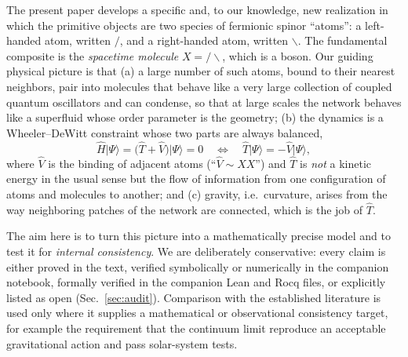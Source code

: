 \documentclass[reprint,aps,prd,amsmath,amssymb,superscriptaddress,nofootinbib,floatfix]{revtex4-2}
\theoremstyle{plain}
\theoremstyle{definition}
\theoremstyle{remark}
\newcommand{\Lat}{\ensuremath{/}}                 %
\newcommand{\Rat}{\ensuremath{\backslash}}        %
\newcommand{\Mol}{\ensuremath{X}}                 %
\newcommand{\ket}[1]{\ensuremath{|#1\rangle}}
\newcommand{\Hc}{\hat{H}}
\newcommand{\Tc}{\hat{T}}
\newcommand{\Vc}{\hat{V}}
\begin{document}
The present paper develops a specific and, to our knowledge, new realization in which the primitive
objects are two species of fermionic spinor ``atoms'': a left-handed atom, written $\Lat$, and a right-handed atom,
written $\Rat$. The fundamental composite is the \emph{spacetime molecule} $\Mol=\Lat\Rat$, which is a boson. Our guiding
physical picture is that (a) a large number of such atoms, bound to their nearest neighbors, pair into molecules
that behave like a very large collection of coupled quantum oscillators and can condense, so that at
large scales the network behaves like a superfluid whose order parameter is the geometry; (b) the dynamics is a
Wheeler--DeWitt constraint whose two parts are always balanced,
\begin{equation}
\Hc\ket{\Psi}=\big(\Tc+\Vc\big)\ket{\Psi}=0
\quad\Longleftrightarrow\quad
\Tc\ket{\Psi}=-\Vc\ket{\Psi},
\label{eq:balance}
\end{equation}
where $\Vc$ is the binding of adjacent atoms (``$\Vc\sim\Mol\Mol$'') and $\Tc$ is \emph{not} a kinetic energy
in the usual sense but the flow of information from one configuration of atoms and molecules to another;
and (c) gravity, i.e.\ curvature, arises from the way neighboring patches of the network are connected,
which is the job of $\Tc$.

The aim here is to turn this picture into a mathematically precise model and to test it for
\emph{internal consistency}. We are deliberately conservative: every claim is either proved in the text,
verified symbolically or numerically in the companion notebook, formally verified in the companion Lean
and Rocq files, or explicitly listed as open (Sec.~\ref{sec:audit}). Comparison with the established literature is
used only where it supplies a mathematical or observational consistency target, for example the
requirement that the continuum limit reproduce an acceptable gravitational action and pass solar-system
tests.
\end{document}
